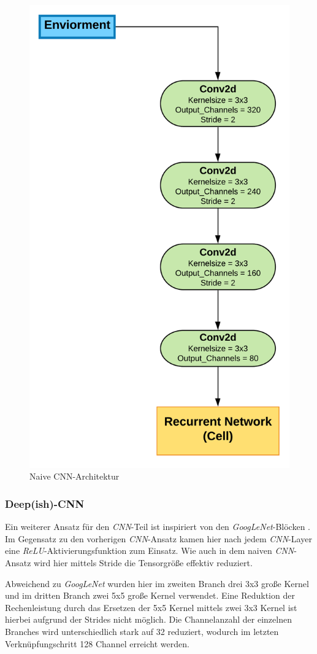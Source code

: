 \documentclass[sigconf,nonacm]{acmart}
\begin{document}
\begin{figure}[hbt!]
\includegraphics[height=\columnwidth]{Netzwerk_Architektur_cn.png}
\caption{Naive CNN-Architektur}
\end{figure}

\subsubsection{Deep(ish)-CNN}\hfill \break
Ein weiterer Ansatz für den \textit{CNN}-Teil ist inspiriert von den \textit{GoogLeNet}-Blöcken \cite{he2015deep}. Im Gegensatz zu den vorherigen \textit{CNN}-Ansatz kamen hier nach jedem \textit{CNN}-Layer eine \textit{ReLU}-Aktivierungsfunktion zum Einsatz. Wie auch in dem naiven \textit{CNN}-Ansatz wird hier mittels Stride die Tensorgröße effektiv reduziert.

Abweichend zu \textit{GoogLeNet} wurden hier im zweiten Branch drei 3x3 große Kernel und im dritten Branch zwei 5x5 große Kernel verwendet. Eine Reduktion der Rechenleistung durch das Ersetzen der 5x5 Kernel mittels zwei 3x3 Kernel ist hierbei aufgrund der Strides nicht möglich. Die Channelanzahl der einzelnen Branches wird unterschiedlich stark auf 32 reduziert, wodurch im letzten Verknüpfungschritt 128 Channel erreicht werden.
\end{document}
